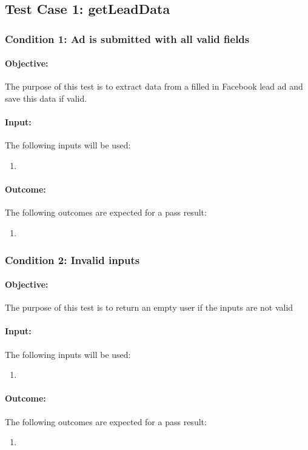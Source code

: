 \documentclass{article}
\begin{document}
\subsection{Test Case 1: getLeadData}\label{test1}
\subsubsection{Condition 1: Ad is submitted with all valid fields }
\paragraph{Objective:} The purpose of this test is to extract data from a filled in Facebook lead ad and save this data if valid.
\paragraph{Input:} The following inputs will be used:
\begin{enumerate}
	\item 
\end{enumerate}
\paragraph{Outcome:} The following outcomes are expected for a pass result:
\begin{enumerate}
	\item 
\end{enumerate}
\subsubsection{Condition 2: Invalid inputs}
\paragraph{Objective:} The purpose of this test is to return an empty user if the inputs are not valid
\paragraph{Input:} The following inputs will be used:
\begin{enumerate}
	\item 
\end{enumerate}
\paragraph{Outcome:} The following outcomes are expected for a pass result:
\begin{enumerate}
	\item 
\end{enumerate}
\end{document}
